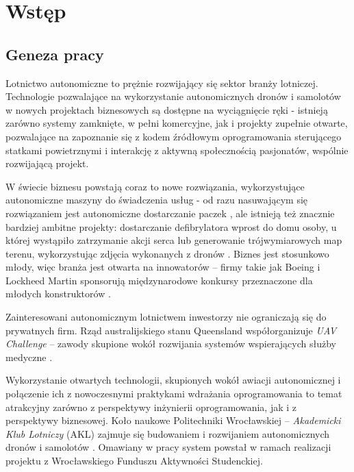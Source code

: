 \chapter{Wstęp}


\section{Geneza pracy}

Lotnictwo autonomiczne to prężnie rozwijający się sektor branży lotniczej.
Technologie pozwalające na wykorzystanie autonomicznych dronów i samolotów
w nowych projektach biznesowych są dostępne na wyciągnięcie ręki - istnieją
zarówno systemy zamknięte, w pełni komercyjne, jak i projekty zupełnie otwarte,
pozwalające na zapoznanie się z kodem źródłowym oprogramowania sterującego statkami
powietrznymi i interakcję z aktywną społecznością pasjonatów, wspólnie rozwijającą
projekt. 

W świecie biznesu powstają coraz to nowe rozwiązania, wykorzystujące autonomiczne
maszyny do świadczenia usług - od razu nasuwającym się rozwiązaniem
jest autonomiczne dostarczanie paczek \cite{prime_air}, ale istnieją też znacznie
bardziej ambitne projekty: dostarczanie defibrylatora wprost do domu osoby, u której
wystąpiło zatrzymanie akcji serca \cite{10.1001/jama.2017.3957} lub generowanie
trójwymiarowych map terenu, wykorzystując zdjęcia wykonanych z dronów
\cite{uav_photogrametry}. Biznes jest stosunkowo młody, więc branża jest otwarta
na innowatorów -- firmy takie jak Boeing i Lockheed Martin sponsorują międzynarodowe
konkursy przeznaczone dla młodych konstruktorów \cite{sae_2018}. 

Zainteresowani autonomicznym lotnictwem inwestorzy nie ograniczają się do
prywatnych firm. Rząd australijskiego stanu Queensland współorganizuje
\textit{UAV Challenge} -- zawody skupione wokół rozwijania systemów wspierających 
służby medyczne \cite{uav_sponsors}.

Wykorzystanie otwartych technologii, skupionych wokół awiacji autonomicznej
i połączenie ich z nowoczesnymi praktykami wdrażania oprogramowania to temat atrakcyjny
zarówno z perspektywy inżynierii oprogramowania, jak i z perspektywy biznesowej. 
Koło naukowe Politechniki Wrocławskiej -- \textit{Akademicki Klub Lotniczy} (AKL) zajmuje
się budowaniem i rozwijaniem autonomicznych dronów i samolotów \cite{akl_home_page}.
Omawiany w pracy system powstał w ramach realizacji projektu
z Wrocławskiego Funduszu Aktywności Studenckiej\cite{fast_webpage}.

